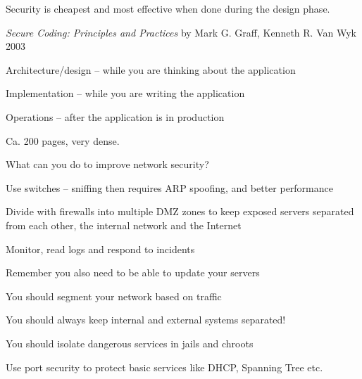 \documentclass[Screen16to9,17pt]{foils}
\begin{document}

\centerline{Security is cheapest and most effective when done during the design phase.}





\vskip 2cm
{\emph{Secure Coding: Principles and Practices} by Mark G. Graff, Kenneth R. Van Wyk 2003}



\begin{list1}
\item Architecture/design -- while you are thinking about the application
\item Implementation -- while you are writing the application
\item Operations -- after the application is in production
\item Ca. 200 pages, very dense.
\end{list1}



\begin{list1}
\item What can you do to improve network security?
\begin{list2}
\item Use switches -- sniffing then requires ARP spoofing, and better performance
\item Divide with firewalls into multiple DMZ zones to keep
      exposed servers separated from each other, the internal network and
      the Internet
\item Monitor, read logs and respond to incidents
\end{list2}
\item Remember you also need to be able to update your servers
\end{list1}



\begin{list1}
\item You should segment your network based on traffic
\item You should always keep internal and external systems separated!
\item You should isolate dangerous services in jails and chroots
\item Use port security to protect basic services like DHCP, Spanning Tree etc.
\end{list1}
\end{document}
